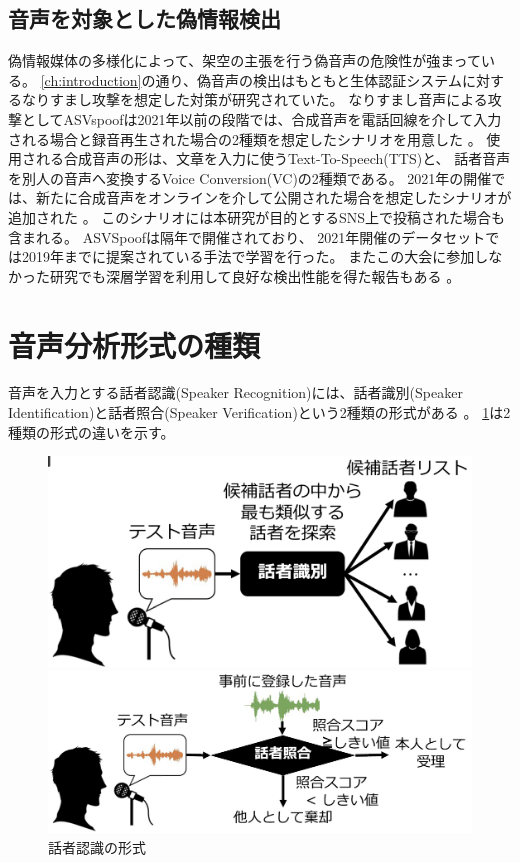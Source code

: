 \subsection{音声を対象とした偽情報検出}
偽情報媒体の多様化によって、架空の主張を行う偽音声の危険性が強まっている。
\cref{ch:introduction}の通り、偽音声の検出はもともと生体認証システムに対するなりすまし攻撃を想定した対策が研究されていた。
なりすまし音声による攻撃としてASVspoofは2021年以前の段階では、合成音声を電話回線を介して入力される場合と録音再生された場合の2種類を想定したシナリオを用意した \cite{7858696}。
使用される合成音声の形は、文章を入力に使うText-To-Speech(TTS)と、
話者音声を別人の音声へ変換するVoice Conversion(VC)の2種類である。
2021年の開催では、新たに合成音声をオンラインを介して公開された場合を想定したシナリオが追加された \cite{yamagishi21_asvspoof}。
このシナリオには本研究が目的とするSNS上で投稿された場合も含まれる。
ASVSpoofは隔年で開催されており、
2021年開催のデータセットでは2019年までに提案されている手法で学習を行った。
またこの大会に参加しなかった研究でも深層学習を利用して良好な検出性能を得た報告もある \cite{10.1145/3394171.3413716}。

\section{音声分析形式の種類}
音声を入力とする話者認識(Speaker Recognition)には、話者識別(Speaker Identification)と話者照合(Speaker Verification)という2種類の形式がある \cite{FURUI1997859,628714,5745552}。
\cref{fig:speaker_recog}は2種類の形式の違いを示す。

\begin{figure}[p]
    \centering
    \begin{minipage}{0.9\linewidth}
        \centering
        \includegraphics[width=0.8\linewidth]{figures/sd.png}
    \end{minipage}
    \begin{minipage}{0.9\linewidth}
        \centering
        \includegraphics[width=0.8\linewidth]{figures/sv.png}
    \end{minipage}
    \caption{話者認識の形式 \cite{俵直弘2022}}
    \label{fig:speaker_recog}
\end{figure}

